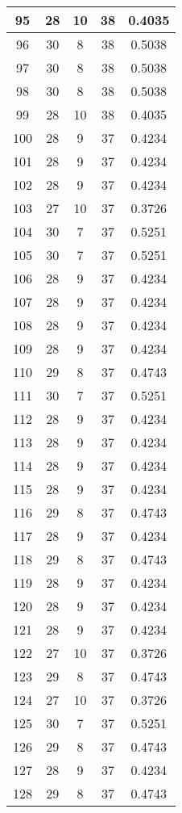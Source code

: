 \documentclass[letterpaper, 12pt]{article}
\begin{document}
\begin{longtable}{|c|c|c|c|c|}
95 & 28 & 10 & 38 & 0.4035 \\
\hline
96 & 30 & 8 & 38 & 0.5038 \\
\hline
97 & 30 & 8 & 38 & 0.5038 \\
\hline
98 & 30 & 8 & 38 & 0.5038 \\
\hline
99 & 28 & 10 & 38 & 0.4035 \\
\hline
100 & 28 & 9 & 37 & 0.4234 \\
\hline
101 & 28 & 9 & 37 & 0.4234 \\
\hline
102 & 28 & 9 & 37 & 0.4234 \\
\hline
103 & 27 & 10 & 37 & 0.3726 \\
\hline
104 & 30 & 7 & 37 & 0.5251 \\
\hline
105 & 30 & 7 & 37 & 0.5251 \\
\hline
106 & 28 & 9 & 37 & 0.4234 \\
\hline
107 & 28 & 9 & 37 & 0.4234 \\
\hline
108 & 28 & 9 & 37 & 0.4234 \\
\hline
109 & 28 & 9 & 37 & 0.4234 \\
\hline
110 & 29 & 8 & 37 & 0.4743 \\
\hline
111 & 30 & 7 & 37 & 0.5251 \\
\hline
112 & 28 & 9 & 37 & 0.4234 \\
\hline
113 & 28 & 9 & 37 & 0.4234 \\
\hline
114 & 28 & 9 & 37 & 0.4234 \\
\hline
115 & 28 & 9 & 37 & 0.4234 \\
\hline
116 & 29 & 8 & 37 & 0.4743 \\
\hline
117 & 28 & 9 & 37 & 0.4234 \\
\hline
118 & 29 & 8 & 37 & 0.4743 \\
\hline
119 & 28 & 9 & 37 & 0.4234 \\
\hline
120 & 28 & 9 & 37 & 0.4234 \\
\hline
121 & 28 & 9 & 37 & 0.4234 \\
\hline
122 & 27 & 10 & 37 & 0.3726 \\
\hline
123 & 29 & 8 & 37 & 0.4743 \\
\hline
124 & 27 & 10 & 37 & 0.3726 \\
\hline
125 & 30 & 7 & 37 & 0.5251 \\
\hline
126 & 29 & 8 & 37 & 0.4743 \\
\hline
127 & 28 & 9 & 37 & 0.4234 \\
\hline
128 & 29 & 8 & 37 & 0.4743 \\

\end{longtable}
\end{document}
